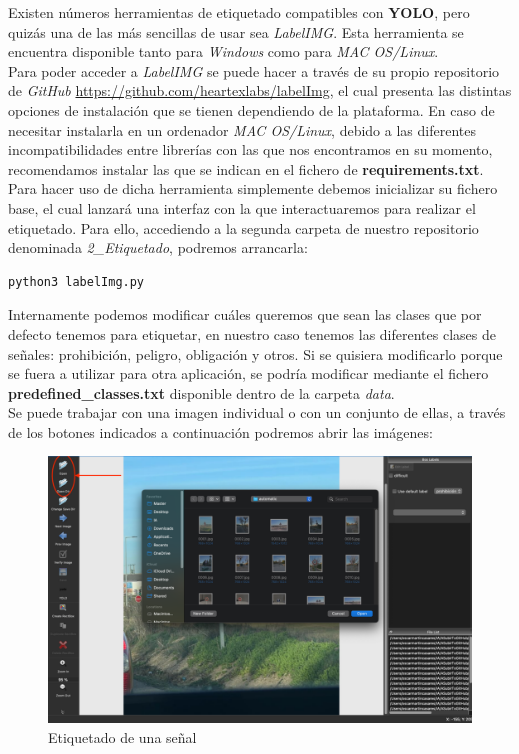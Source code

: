Existen números herramientas de etiquetado compatibles con \textbf{YOLO}, pero quizás una de las más sencillas de usar sea \textit{LabelIMG}. Esta herramienta se encuentra disponible tanto para \textit{Windows} como para \textit{MAC OS/Linux}.\\

Para poder acceder a \textit{LabelIMG} se puede hacer a través de su propio repositorio de \textit{GitHub} \url{https://github.com/heartexlabs/labelImg}, el cual presenta las distintas opciones de instalación que se tienen dependiendo de la plataforma. En caso de necesitar instalarla en un ordenador \textit{MAC OS/Linux}, debido a las diferentes incompatibilidades entre librerías con las que nos encontramos en su momento, recomendamos instalar las que se indican en el fichero de \textbf{requirements.txt}. \\

Para hacer uso de dicha herramienta simplemente debemos inicializar su fichero base, el cual lanzará una interfaz con la que interactuaremos para realizar el etiquetado. Para ello, accediendo a la segunda carpeta de nuestro repositorio denominada \textit{2_Etiquetado}, podremos arrancarla:

\begin{lstlisting}
python3 labelImg.py
\end{lstlisting}

Internamente podemos modificar cuáles queremos que sean las clases que por defecto tenemos para etiquetar, en nuestro caso tenemos las diferentes clases de señales: prohibición, peligro, obligación y otros. Si se quisiera modificarlo porque se fuera a utilizar para otra aplicación, se podría modificar mediante el fichero \textbf{predefined_classes.txt} disponible dentro de la carpeta \textit{data}.\\

Se puede trabajar con una imagen individual o con un conjunto de ellas, a través de los botones indicados a continuación podremos abrir las imágenes:

\begin{figure}[H]
	\centering
	\includegraphics[width=\textwidth]{Imagenes/AnexoI_Manual/AA/etiquetado1.pdf}
	\caption{Etiquetado de una señal}
	\label{etique1}
\end{figure}